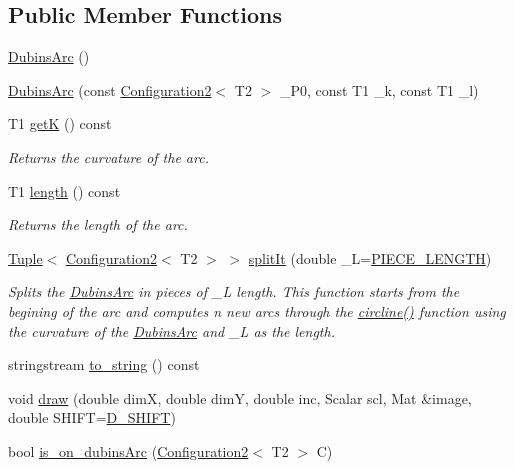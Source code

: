 \subsection*{Public Member Functions}
\begin{DoxyCompactItemize}
\item 
\mbox{\hyperlink{class_dubins_arc_ad09a4671b1b63f630d01b10ef3e48fb0}{Dubins\+Arc}} ()
\item 
\mbox{\hyperlink{class_dubins_arc_a213b0e587638328be1e448869e351475}{Dubins\+Arc}} (const \mbox{\hyperlink{class_configuration2}{Configuration2}}$<$ T2 $>$ \+\_\+\+P0, const T1 \+\_\+k, const T1 \+\_\+l)
\item 
T1 \mbox{\hyperlink{class_dubins_arc_af3fefdb90ba414db3560ef12b329f54a}{getK}} () const
\begin{DoxyCompactList}\small\item\em Returns the curvature of the arc. \end{DoxyCompactList}\item 
T1 \mbox{\hyperlink{class_dubins_arc_a1b0bfacb344d17377f4bda55fdaecae4}{length}} () const
\begin{DoxyCompactList}\small\item\em Returns the length of the arc. \end{DoxyCompactList}\item 
\mbox{\hyperlink{class_tuple}{Tuple}}$<$ \mbox{\hyperlink{class_configuration2}{Configuration2}}$<$ T2 $>$ $>$ \mbox{\hyperlink{class_dubins_arc_af7c6ad3f4c81b2b75c9f439afd9fa746}{split\+It}} (double \+\_\+L=\mbox{\hyperlink{dubins_8hh_a5b2500ca93a5100f73dc442d3cfea7d4}{P\+I\+E\+C\+E\+\_\+\+L\+E\+N\+G\+TH}})
\begin{DoxyCompactList}\small\item\em Splits the {\ttfamily \mbox{\hyperlink{class_dubins_arc}{Dubins\+Arc}}} in pieces of \+\_\+L length. This function starts from the begining of the arc and computes n new arcs through the {\ttfamily \mbox{\hyperlink{dubins_8cc_adef8b363044d7fed558e5b47d8d6a3a0}{circline()}}} function using the curvature of the {\ttfamily \mbox{\hyperlink{class_dubins_arc}{Dubins\+Arc}}} and \+\_\+L as the length. \end{DoxyCompactList}\item 
stringstream \mbox{\hyperlink{class_dubins_arc_aa90c32f88f048e4e17ea79489f44dbfb}{to\+\_\+string}} () const
\item 
void \mbox{\hyperlink{class_dubins_arc_a649ed569e8d8786e54d1553dd6be8dcb}{draw}} (double dimX, double dimY, double inc, Scalar scl, Mat \&image, double S\+H\+I\+FT=\mbox{\hyperlink{dubins_8hh_ad18a9640dcab4f84a2b1710a78bf813e}{D\+\_\+\+S\+H\+I\+FT}})
\item 
bool \mbox{\hyperlink{class_dubins_arc_aa92108d7dab38e8ace212d621f9fb8dc}{is\+\_\+on\+\_\+dubins\+Arc}} (\mbox{\hyperlink{class_configuration2}{Configuration2}}$<$ T2 $>$ C)
\end{DoxyCompactItemize}
